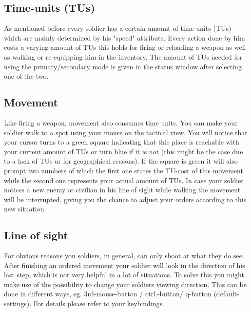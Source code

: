 \subsection{Time-units (TUs)}
As mentioned before every soldier has a certain amount of time units (TUs) which are mainly determined by his "speed" attribute. Every action done by him costs a varying amount of TUs this holds for firing or reloading a weapon as well as walking or re-equipping him in the inventory. The amount of TUs needed for using the primary/secondary mode is given in the status window after selecting one of the two.

\subsection{Movement}
Like firing a weapon, movement also consumes time units. You can make your soldier walk to a spot using your mouse on the tactical view. You will notice that your cursor turns to a green square indicating that this place is reachable with your current amount of TUs or turn blue if it is not (this might be the case due to a lack of TUs or for geographical reasons). If the square is green it will also prompt two numbers of which the first one states the TU-cost of this movement while the second one represents your actual amount of TUs. In case your soldier notices a new enemy or civilian in his line of sight while walking the movement will be interrupted, giving you the chance to adjust your orders according to this new situation.

\subsection{Line of sight}
For obvious reasons you soldiers, in general, can only shoot at what they do see. After finishing an ordered movement your soldier will look in the direction of his last step, which is not very helpful in a lot of situations. To solve this you might make use of the possibility to change your soldiers viewing direction. This can be done in different ways, eg. 3rd-mouse-button / ctrl.-button/ q-button (default-settings). For details please refer to your keybindings. 
